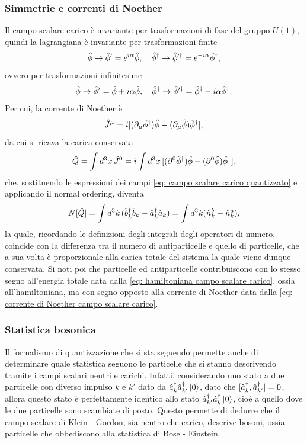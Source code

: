 \subsubsection{Simmetrie e correnti di Noether}
Il campo scalare carico è invariante per trasformazioni di fase del gruppo $U(1)$, quindi la lagrangiana è invariante per trasformazioni finite
\begin{equation}
    \hat{\phi}\to\hat{\phi}' = e^{i\alpha}\hat{\phi},\quad\hat{\phi}^\dagger\to\hat{\phi}'^\dagger = e^{-i\alpha}\hat{\phi}^\dagger,
\end{equation}
ovvero per trasformazioni infinitesime
\begin{equation}
    \hat{\phi}\to\hat{\phi}' = \hat{\phi} + i\alpha\hat{\phi},\quad\hat{\phi}^\dagger\to\hat{\phi}'^\dagger = \hat{\phi}^\dagger - i\alpha\hat{\phi}^\dagger.
\end{equation}
Per cui, la corrente di Noether è
\begin{equation}
\label{eq: corrente di Noether campo scalare carico}
    \hat{J}^\mu = i[(\partial_\mu\hat{\phi}^\dagger)\hat{\phi} - (\partial_\mu\hat{\phi})\hat{\phi}^\dagger],
\end{equation}
da cui si ricava la carica conservata
\begin{equation}
    \hat{Q} = \int d^3x\,\hat{J}^0 = i\int d^3x\,[(\partial^0\hat{\phi}^\dagger)\hat{\phi} - (\partial^0\hat{\phi})\hat{\phi}^\dagger],
\end{equation}
che, sostituendo le espressioni dei campi \eqref{eq: campo scalare carico quantizzato} e applicando il normal ordering, diventa
\begin{equation}
\label{eq: carica conservata campo scalare carico}
    N[\hat{Q}] = \int d^3k\,(\hat{b}^\dagger_k\hat{b}_k - \hat{a}^\dagger_k\hat{a}_k) = \int d^3k (\hat{n}_k^b - \hat{n}^a_k),
\end{equation}
la quale, ricordando le definizioni degli integrali degli operatori di numero, coincide con la differenza tra il numero di antiparticelle e quello di particelle, che a sua volta è proporzionale alla carica totale del sistema la quale viene dunque conservata. Si noti poi che particelle ed antiparticelle contribuiscono con lo stesso segno all'energia totale data dalla \eqref{eq: hamiltoniana campo scalare carico}, ossia all'hamiltoniana, ma con segno opposto alla corrente di Noether data dalla \eqref{eq: corrente di Noether campo scalare carico}.

\subsubsection{Statistica bosonica}
Il formalismo di quantizzazione che si sta seguendo permette anche di determinare quale statistica seguono le particelle che si stanno descrivendo tramite i campi scalari neutri e carichi. Infatti, considerando uno stato a due particelle con diverso impulso $k$ e $k'$ dato da $\hat{a}^\dagger_k\hat{a}^\dagger_{k'}\ket{0}$, dato che $[\hat{a}^\dagger_k,\hat{a}^\dagger_{k'}] = 0$, allora questo stato è perfettamente identico allo stato $\hat{a}^\dagger_{k'}\hat{a}^\dagger_k\ket{0}$, cioè a quello dove le due particelle sono scambiate di posto. Questo permette di dedurre che il campo scalare di Klein - Gordon, sia neutro che carico, descrive bosoni, ossia particelle che obbediscono alla statistica di Bose - Einstein.

